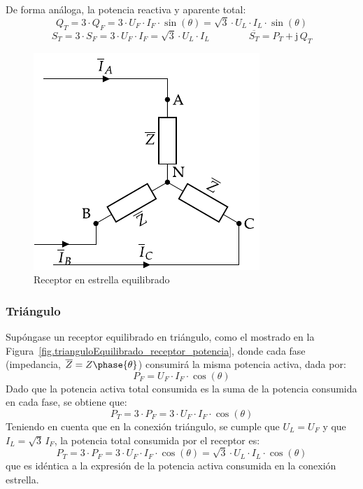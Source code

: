 	
	De forma análoga, la potencia reactiva y aparente total:
	\begin{equation}
	    \boxed{Q_T=3\cdot Q_F=3\cdot U_F\cdot {I_F}\cdot\sin(\theta)=\sqrt{3}\cdot U_L\cdot I_L\cdot\sin(\theta)}
	\end{equation}
	\begin{equation}
	    \boxed{S_T=3\cdot S_F=3\cdot U_F\cdot {I_F}=\sqrt{3}\cdot U_L\cdot I_L}\qquad\qquad \boxed{\overline{S_T}=P_T+\mathrm{j}\,Q_T}
	\end{equation}
	
	\begin{figure}
	    \centering
	    \includegraphics{../figs/EstrellaEquilibrado_Receptor_SN.pdf}
	    \caption{Receptor en estrella equilibrado}
	    \label{fig.estrellaequilibrado_SN_potencia}
	\end{figure}
	
	\subsubsection{Triángulo}
	
	Supóngase un receptor equilibrado en triángulo, como el mostrado en la Figura~\ref{fig.trianguloEquilibrado_receptor_potencia}, donde cada fase (impedancia, $\overline{Z}=Z\phase{\theta}$) consumirá la misma potencia activa, dada por: 
	\begin{equation*}
	    P_F=U_{F}\cdot I_F \cdot \cos(\theta)
	\end{equation*}
	Dado que la potencia activa total consumida es la suma de la potencia consumida en cada fase, se obtiene que:
	\begin{equation*}
	    P_T=3\cdot P_F=3\cdot U_F\cdot I_F\cdot\cos(\theta)
	\end{equation*}
	Teniendo en cuenta que en la conexión triángulo, se cumple que $U_L=U_F$ y que $I_L=\sqrt{3}\,I_F$, la potencia total consumida por el receptor es: 
	\begin{equation}
	    \boxed{P_T=3\cdot P_F=3\cdot U_F\cdot {I_F}\cdot\cos(\theta)=\sqrt{3}\cdot U_L\cdot I_L\cdot\cos(\theta)}
	\end{equation}
	que es idéntica a la expresión de la potencia activa consumida en la conexión estrella.
	
